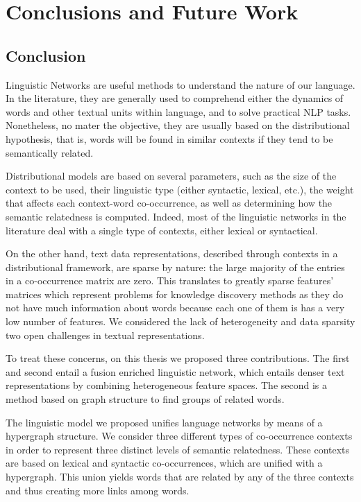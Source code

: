\chapter{Conclusions and Future Work}
\label{chap:conclusions}
\section{Conclusion}
Linguistic Networks are useful methods to understand the nature of our language. In the literature, they are generally used to comprehend either the dynamics of words and other textual units within language, and to solve practical NLP tasks. Nonetheless, no mater the objective, they are usually based on the distributional hypothesis, that is, words will be found in similar contexts if they tend to be semantically related.

Distributional models are based on several parameters, such as the size of the context to be used, their linguistic type (either syntactic, lexical, etc.), the weight that affects each context-word co-occurrence, as well as determining how the semantic relatedness is computed. Indeed, most of the linguistic networks in the literature deal with a single type of contexts, either lexical or syntactical.

On the other hand, text data representations, described through contexts in a distributional framework, are sparse by nature: the large majority of the entries in a co-occurrence matrix are zero. This translates to greatly sparse features' matrices which represent problems for knowledge discovery methods as they do not have much information about words because each one of them is has a very low number of features. We considered the lack of heterogeneity and data sparsity two open challenges in textual representations.

To treat these concerns, on this thesis we proposed three contributions. The first and second entail a fusion enriched linguistic network,  which entails denser text representations by combining heterogeneous feature spaces. The second is a method based on graph structure to find groups of related words.

The linguistic model we proposed unifies language networks by means of a hypergraph structure. We consider three different types of co-occurrence contexts in order to represent three distinct levels of semantic relatedness. These contexts are based on lexical and syntactic co-occurrences, which are unified with a hypergraph. This union yields words that are related by any of the three contexts and thus creating more links among words. 

